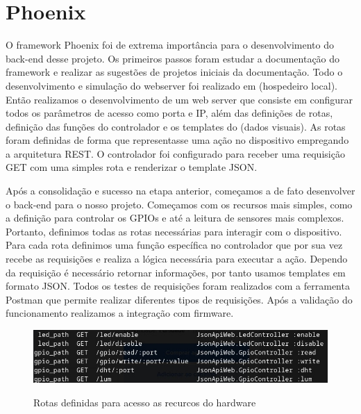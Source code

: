 \documentclass[../../layout.tex]{subfiles}
\begin{document}
\section{Phoenix}
\hspace*{3em}O framework Phoenix foi de extrema importância para o desenvolvimento do back-end desse projeto. Os primeiros passos foram estudar a documentação do framework e realizar as sugestões de projetos iniciais da documentação. Todo o desenvolvimento e simulação do webserver foi realizado em  (hospedeiro local). Então realizamos o desenvolvimento de um web server que consiste em configurar todos os parâmetros de acesso como porta e IP, além  das definições de rotas, definição das funções do controlador e os templates do (dados visuais). As rotas foram definidas de forma que representasse uma ação no dispositivo  empregando a arquitetura REST. O controlador foi configurado para receber uma requisição GET com uma simples rota e renderizar o template  JSON.\par
Após a consolidação e sucesso na etapa anterior, começamos a de fato desenvolver o back-end para o nosso projeto. Começamos com os recursos mais simples, como a definição para controlar os GPIOs e até a leitura de sensores mais complexos. Portanto, definimos todas as rotas necessárias para interagir com o dispositivo. Para cada rota definimos uma função específica no controlador que por sua vez recebe as requisições e realiza a lógica necessária para executar a ação. Dependo da requisição é necessário retornar informações, por tanto usamos templates  em formato JSON.  Todos os testes de requisições foram realizados com a ferramenta Postman que permite realizar diferentes tipos de requisições. Após a validação do funcionamento realizamos a integração com firmware.

\begin{figure}[H]
\centering
\caption{Rotas definidas para acesso as recurcos do hardware}
\includegraphics[width=1\textwidth]{assets/static/img/rotas.jpg}
\label{fig:request_gpio}
\begin{minipage}{0.5\textwidth}
\end{minipage}
\end{figure}
\end{document}
